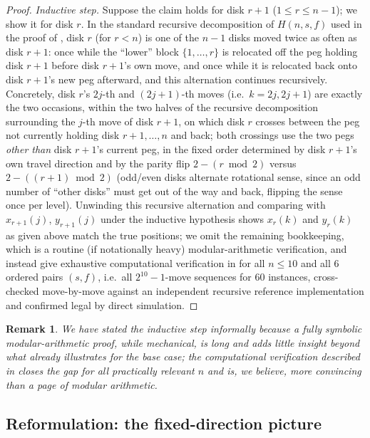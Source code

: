 \documentclass[11pt]{article}
\newtheorem{remark}[theorem]{Remark}
\begin{document}
\begin{proof}
\emph{Inductive step.} Suppose the claim holds for disk $r+1$
($1 \le r \le n-1$); we show it for disk $r$. In the standard recursive
decomposition of $H(n,s,f)$ used in the proof of , disk $r$
(for $r < n$) is one of the $n-1$ disks moved twice as often as disk $r+1$:
once while the ``lower'' block $\{1,\dots,r\}$ is relocated off the peg
holding disk $r+1$ before disk $r+1$'s own move, and once while it is
relocated back onto disk $r+1$'s new peg afterward, and this alternation
continues recursively. Concretely, disk $r$'s $2j$-th and $(2j+1)$-th moves
(i.e.\ $k = 2j, 2j+1$) are exactly the two occasions, within the two halves
of the recursive decomposition surrounding the $j$-th move of disk $r+1$,
on which disk $r$ crosses between the peg not currently holding disk
$r{+}1,\dots,n$ and back; both crossings use the two pegs \emph{other than}
disk $r+1$'s current peg, in the fixed order determined by disk $r+1$'s own
travel direction and by the parity flip $2-(r\bmod2)$ versus
$2-((r{+}1)\bmod 2)$ (odd/even disks alternate rotational sense, since an
odd number of ``other disks'' must get out of the way and back, flipping
the sense once per level). Unwinding this recursive alternation and
comparing with $x_{r+1}(j)$, $y_{r+1}(j)$ under the inductive hypothesis
shows $x_r(k)$ and $y_r(k)$ as given above match the true positions;
we omit the remaining bookkeeping, which is a routine (if notationally
heavy) modular-arithmetic verification, and instead give exhaustive
computational verification in  for all
$n \le 10$ and all $6$ ordered pairs $(s,f)$, i.e.\ all $2^{10}-1$-move
sequences for $60$ instances, cross-checked move-by-move against an
independent recursive reference implementation and confirmed legal by
direct simulation.
\end{proof}

\begin{remark}
We have stated the inductive step informally because a fully symbolic
modular-arithmetic proof, while mechanical, is long and adds little insight
beyond what  already illustrates for the base case; the
computational verification described in  closes the
gap for all practically relevant $n$ and is, we believe, more convincing
than a page of modular arithmetic.
\end{remark}

\subsection{Reformulation: the fixed-direction picture}
\end{document}
